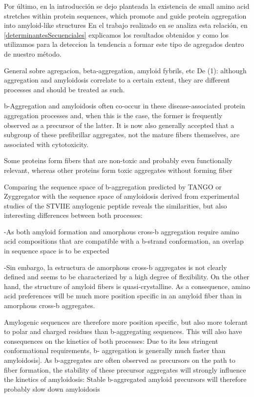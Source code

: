 Por último, en la introducción se dejo planteada la existencia de 
small amino acid stretches within protein sequences, which
promote and guide protein aggregation into amyloid-like structures
En el trabajo realizado en \cite{de2004sequence} se analiza esta relación, 
en \ref{determinantesSecuenciales} explicamos los resultados obtenidos y como los utilizamos para la deteccion la tendencia a formar este tipo de agregados dentro de nuestro método.






General sobre agregacion, beta-aggregation, amyloid fybrils, etc
De (1): although aggregation and amyloidosis correlate to a certain extent, they are different processes and should be treated as such.

b-Aggregation and amyloidosis often co-occur in these disease-associated protein aggregation processes and, when this is the case, the former is frequently observed as a precursor of the latter. 
It is now also generally accepted that a subgroup of these prefibrillar aggregates, not the mature fibers themselves, are associated with cytotoxicity.

Some proteins form fibers that are non-toxic and probably even functionally relevant, whereas other proteins form toxic aggregates without forming fiber

Comparing the sequence space of b-aggregation predicted by TANGO or Zyggregator with the sequence space of amyloidosis derived from experimental studies of the STVIIE amylogenic peptide reveals the similarities, 
but also interesting differences between both processes:

-As both amyloid formation and amorphous cross-b aggregation require amino acid compositions that are compatible with a b-strand conformation, an overlap in
sequence space is to be expected

-Sin embargo, la estructura de amorphous cross-b aggregates is not
clearly defined and seems to be characterized by a high degree of flexibility. On the other hand, the structure of amyloid fibers is quasi-crystalline. As a consequence, amino acid preferences will be much more position specific in an amyloid fiber than in amorphous cross-b aggregates.

Amylogenic sequences are therefore more position specific, but also more tolerant to polar and charged residues than b-aggregating sequences. This will also have consequences on the kinetics of both processes: Due to its less stringent conformational requirements, b-
aggregation is generally much faster than amyloidosis]. 
As b-aggregates are often observed as precursors on the path to fiber formation, the stability of these precursor aggregates will strongly influence the kinetics of amyloidosis: Stable b-aggregated amyloid precursors will therefore probably slow down amyloidosis

